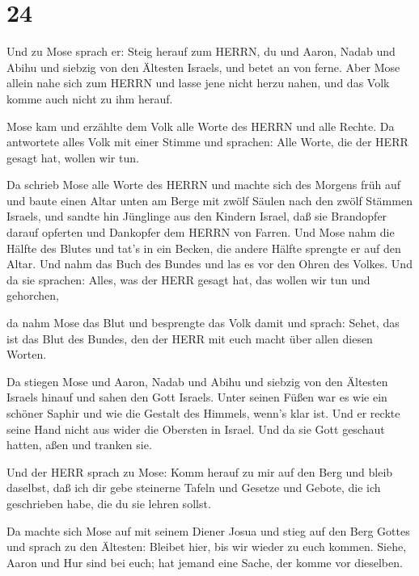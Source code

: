 \hypertarget{section-23}{%
\section{24}\label{section-23}}

 Und zu Mose sprach er: Steig herauf zum HERRN, du und
Aaron, Nadab und Abihu und siebzig von den Ältesten Israels, und betet
an von ferne.  Aber Mose allein nahe sich zum HERRN und
lasse jene nicht herzu nahen, und das Volk komme auch nicht zu ihm
herauf.

 Mose kam und erzählte dem Volk alle Worte des HERRN und
alle Rechte. Da antwortete alles Volk mit einer Stimme und sprachen:
Alle Worte, die der HERR gesagt hat, wollen wir tun.

 Da schrieb Mose alle Worte des HERRN und machte sich des
Morgens früh auf und baute einen Altar unten am Berge mit zwölf Säulen
nach den zwölf Stämmen Israels,  und sandte hin Jünglinge
aus den Kindern Israel, daß sie Brandopfer darauf opferten und Dankopfer
dem HERRN von Farren.  Und Mose nahm die Hälfte des Blutes
und tat's in ein Becken, die andere Hälfte sprengte er auf den Altar.
 Und nahm das Buch des Bundes und las es vor den Ohren des
Volkes. Und da sie sprachen: Alles, was der HERR gesagt hat, das wollen
wir tun und gehorchen,

 da nahm Mose das Blut und besprengte das Volk damit und
sprach: Sehet, das ist das Blut des Bundes, den der HERR mit euch macht
über allen diesen Worten.

 Da stiegen Mose und Aaron, Nadab und Abihu und siebzig von
den Ältesten Israels hinauf  und sahen den Gott Israels.
Unter seinen Füßen war es wie ein schöner Saphir und wie die Gestalt des
Himmels, wenn's klar ist.  Und er reckte seine Hand nicht
aus wider die Obersten in Israel. Und da sie Gott geschaut hatten, aßen
und tranken sie.

 Und der HERR sprach zu Mose: Komm herauf zu mir auf den
Berg und bleib daselbst, daß ich dir gebe steinerne Tafeln und Gesetze
und Gebote, die ich geschrieben habe, die du sie lehren sollst.

 Da machte sich Mose auf mit seinem Diener Josua und stieg
auf den Berg Gottes  und sprach zu den Ältesten: Bleibet
hier, bis wir wieder zu euch kommen. Siehe, Aaron und Hur sind bei euch;
hat jemand eine Sache, der komme vor dieselben.

